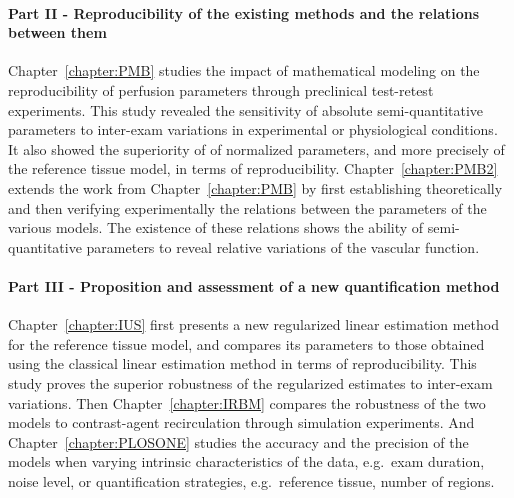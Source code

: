 \paragraph{Part II - Reproducibility of the existing methods and the relations between them}
Chapter~\ref{chapter:PMB} studies the impact of mathematical modeling on the reproducibility of perfusion parameters through preclinical test-retest experiments.
This study revealed the sensitivity of absolute semi-quantitative parameters to inter-exam variations in experimental or physiological conditions.
It also showed the superiority of of normalized parameters, and more precisely of the reference tissue model, in terms of reproducibility.
Chapter~\ref{chapter:PMB2} extends the work from Chapter~\ref{chapter:PMB} by first establishing theoretically and then verifying experimentally the relations between the parameters of the various models.
The existence of these relations shows the ability of semi-quantitative parameters to reveal relative variations of the vascular function.

\paragraph{Part III - Proposition and assessment of a new quantification method}
Chapter~\ref{chapter:IUS} first presents a new regularized linear estimation method for the reference tissue model, and compares its parameters to those obtained using the classical linear estimation method in terms of reproducibility.
This study proves the superior robustness of the regularized estimates to inter-exam variations.
Then Chapter~\ref{chapter:IRBM} compares the robustness of the two models to contrast-agent recirculation through simulation experiments.
And Chapter~\ref{chapter:PLOSONE} studies the accuracy and the precision of the models when varying intrinsic characteristics of the data, e.g.~exam duration, noise level, or quantification strategies, e.g.~reference tissue, number of regions.

\newpage

